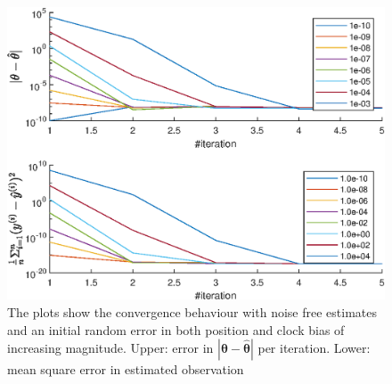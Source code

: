 \begin{figure}[htb]
    \centering %
  \includegraphics[width=0.8\linewidth]{Results/SimulationEstPos/mixedNoiseConv}
\caption{\label{fig:mixedConv} The plots show the convergence behaviour with noise free estimates and an initial random error in both position and clock bias of increasing magnitude. Upper: error in $|{\boldsymbol \theta}-\hat{{\boldsymbol \theta}}|$ per iteration. Lower: mean square error in estimated observation}
\end{figure}	

